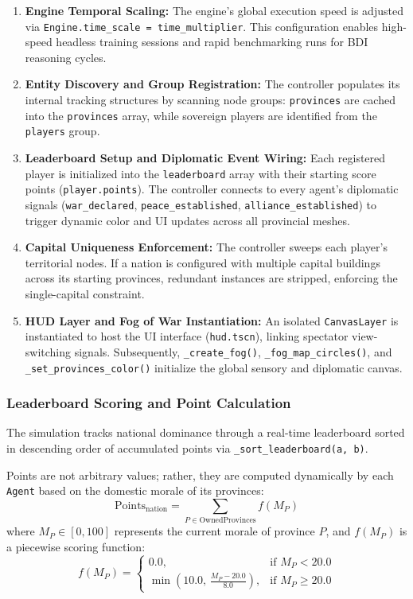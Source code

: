 \begin{enumerate}
    \item \textbf{Engine Temporal Scaling:} The engine's global execution speed is adjusted via \texttt{Engine.time\_scale = time\_multiplier}. This configuration enables high-speed headless training sessions and rapid benchmarking runs for BDI reasoning cycles.
    \item \textbf{Entity Discovery and Group Registration:} The controller populates its internal tracking structures by scanning node groups: \texttt{provinces} are cached into the \texttt{provinces} array, while sovereign players are identified from the \texttt{players} group.
    \item \textbf{Leaderboard Setup and Diplomatic Event Wiring:} Each registered player is initialized into the \texttt{leaderboard} array with their starting score points (\texttt{player.points}). The controller connects to every agent's diplomatic signals (\texttt{war\_declared}, \texttt{peace\_established}, \texttt{alliance\_established}) to trigger dynamic color and UI updates across all provincial meshes.
    \item \textbf{Capital Uniqueness Enforcement:} The controller sweeps each player's territorial nodes. If a nation is configured with multiple capital buildings across its starting provinces, redundant instances are stripped, enforcing the single-capital constraint.
    \item \textbf{HUD Layer and Fog of War Instantiation:} An isolated \texttt{CanvasLayer} is instantiated to host the UI interface (\texttt{hud.tscn}), linking spectator view-switching signals. Subsequently, \texttt{\_create\_fog()}, \texttt{\_fog\_map\_circles()}, and \texttt{\_set\_provinces\_color()} initialize the global sensory and diplomatic canvas.
\end{enumerate}

\subsubsection{Leaderboard Scoring and Point Calculation}
The simulation tracks national dominance through a real-time leaderboard sorted in descending order of accumulated points via \texttt{\_sort\_leaderboard(a, b)}. 

Points are not arbitrary values; rather, they are computed dynamically by each \texttt{Agent} based on the domestic morale of its provinces:
\begin{equation}
    \text{Points}_{\text{nation}} = \sum_{P \in \text{OwnedProvinces}} f(M_P)
\end{equation}
where $M_P \in [0, 100]$ represents the current morale of province $P$, and $f(M_P)$ is a piecewise scoring function:
\begin{equation}
    f(M_P) = \begin{cases}
        0.0, & \text{if } M_P < 20.0 \\
        \min\left(10.0, \, \frac{M_P - 20.0}{8.0}\right), & \text{if } M_P \ge 20.0
    \end{cases}
\end{equation}

